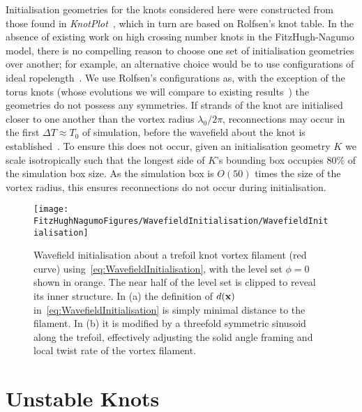 Initialisation geometries for the knots considered here were constructed from those found in \emph{KnotPlot}~\citep{KnotPlot}, which in turn are based on Rolfsen's knot table. In the absence of existing work on high crossing number knots in the FitzHugh-Nagumo model, there is no compelling reason to choose one set of initialisation geometries over another; for example, an alternative choice would be to use configurations of ideal ropelength~\citep{Cantarella2011,Kleckner2016,Maucher2017}. We use Rolfsen's configurations as, with the exception of the torus knots (whose evolutions we will compare to existing results~\citep{Maucher2017}) the geometries do not possess any symmetries. If strands of the knot are initialised closer to one another than the vortex radius $\lambda_0 /2\pi$, reconnections may occur in the first $\Delta T \approx T_0$ of simulation, before the wavefield about the knot is established~\citep{Maucher2016}. To ensure this does not occur, given an initialisation geometry $K$ we scale isotropically such that the longest side of $K$'s bounding box occupies $80\%$ of the simulation box size. As the simulation box is $O(50)$ times the size of the vortex radius, this ensures reconnections do not occur during initialisation. 

\begin{figure}[htbp]
\centering
\texttt{[image: \\FitzHughNagumoFigures/WavefieldInitialisation/WavefieldInitialisation]}
\caption{Wavefield initialisation about a trefoil knot vortex filament (red curve) using~\eqref{eq:WavefieldInitialisation}, with the level set $\phi = 0 $ shown in orange. The near half of the level set is clipped to reveal its inner structure. In (a) the definition of $d({\bf x})$ in~\eqref{eq:WavefieldInitialisation} is simply minimal distance to the filament. In (b) it is modified by a threefold symmetric sinusoid along the trefoil, effectively adjusting the solid angle framing and local twist rate of the vortex filament.}
\label{fig:WavefieldInitialisation}
\end{figure}


\section{\label{sec:UnstableKnots}Unstable Knots}


